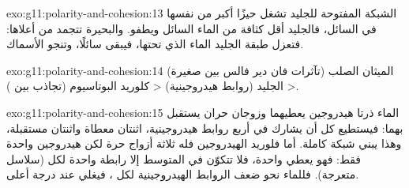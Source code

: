 \begin{solution}{exo:g11:polarity-and-cohesion:13}
الشبكة المفتوحة للجليد تشغل حيزًا أكبر من  نفسها في السائل، فالجليد
أقل كثافة من الماء السائل ويطفو. والبحيرة تتجمد من أعلاها: فتعزل طبقة الجليد
الماء الذي تحتها، فيبقى سائلًا، وتنجو الأسماك.
\end{solution}

\begin{solution}{exo:g11:polarity-and-cohesion:14}
الميثان الصلب (تآثرات فان دير فالس بين  صغيرة) <
الجليد (روابط هيدروجينية) < كلوريد البوتاسيوم (تجاذب بين ).
\end{solution}

\begin{solution}{exo:g11:polarity-and-cohesion:15}
 الماء ذرتا هيدروجين يعطيهما وزوجان حران يستقبل بهما: فيستطيع كل
 أن يشارك في أربع روابط هيدروجينية، اثنتان معطاة واثنتان مستقبلة، وهذا يبني
شبكة كاملة. أما  فلوريد الهيدروجين فله ثلاثة أزواج حرة لكن  هيدروجين واحدة
فقط: فهو يعطي  واحدة، فلا تتكوّن في المتوسط إلا رابطة واحدة لكل
 (سلاسل متعرجة). فللماء نحو ضعف الروابط الهيدروجينية لكل ،
فيغلي عند درجة أعلى.
\end{solution}

